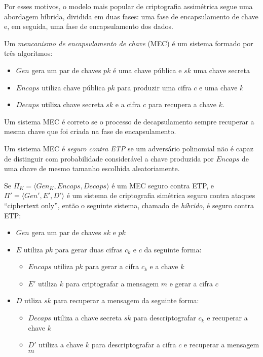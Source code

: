 Por esses motivos, o modelo mais popular de criptografia assimétrica segue uma abordagem híbrida, dividida em duas fases:
uma fase de encapsulamento de chave e, em seguida, uma fase de encapsulamento dos dados.

Um {\em mencanismo de encapsulamento de chave} (MEC) é um sistema formado por três algoritmos:
\begin{itemize}
\item[] $Gen$ gera um par de chaves $pk$ é uma chave pública e $sk$ uma chave secreta
\item[] $Encaps$ utiliza chave pública $pk$ para produzir uma cifra $c$ e uma chave $k$
\item[] $Decaps$ utiliza chave secreta $sk$ e a cifra $c$ para recupera a chave $k$.
\end{itemize}

Um sistema MEC é correto se o processo de decapsulamento sempre recuperar a mesma chave que foi criada na fase de encapsulamento.

Um sistema MEC é {\em seguro contra ETP} se um adversário polinomial não é capaz de distinguir com probabilidade considerável a chave produzida por $Encaps$ de uma chave de mesmo tamanho escolhida aleatoriamente.

Se $\Pi_K = \langle Gen_K, Encaps, Decaps \rangle$ é um MEC seguro contra ETP, e $\Pi' = \langle Gen', E', D' \rangle$ é um sistema de criptografia simétrica seguro contra ataques ``ciphertext only'', então o seguinte sistema, chamado de {\em híbrido}, é seguro contra ETP:

\begin{itemize}
\item[] $Gen$ gera um par de chaves $sk$ e $pk$
\item[] $E$ utiliza $pk$ para gerar duas cifras $c_k$ e $c$ da seguinte forma:
  \begin{itemize}
  \item $Encaps$ utiliza $pk$ para gerar a cifra $c_k$ e a chave $k$
  \item $E'$ utiliza $k$ para criptografar a mensagem $m$ e gerar a cifra $c$
  \end{itemize}
\item[] $D$ utliza $sk$ para recuperar a mensagem da seguinte forma:
  \begin{itemize}
  \item $Decaps$ utiliza a chave secreta $sk$ para descriptografar $c_k$ e recuperar a chave $k$
  \item $D'$ utiliza a chave $k$ para descriptografar a cifra $c$ e recuperar a mensagem $m$
  \end{itemize}
\end{itemize}

